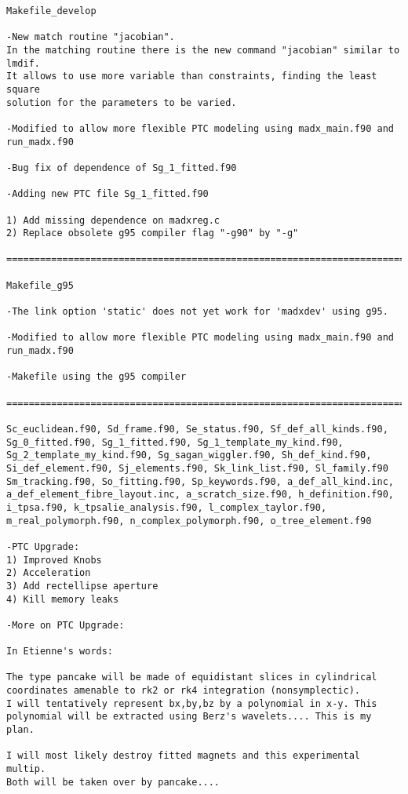 \begin{verbatim}
Makefile_develop

-New match routine "jacobian".
In the matching routine there is the new command "jacobian" similar to lmdif.
It allows to use more variable than constraints, finding the least square
solution for the parameters to be varied.

-Modified to allow more flexible PTC modeling using madx_main.f90 and
run_madx.f90

-Bug fix of dependence of Sg_1_fitted.f90

-Adding new PTC file Sg_1_fitted.f90

1) Add missing dependence on madxreg.c
2) Replace obsolete g95 compiler flag "-g90" by "-g"

=============================================================================

Makefile_g95

-The link option 'static' does not yet work for 'madxdev' using g95.

-Modified to allow more flexible PTC modeling using madx_main.f90 and
run_madx.f90

-Makefile using the g95 compiler

=============================================================================

Sc_euclidean.f90, Sd_frame.f90, Se_status.f90, Sf_def_all_kinds.f90,
Sg_0_fitted.f90, Sg_1_fitted.f90, Sg_1_template_my_kind.f90,
Sg_2_template_my_kind.f90, Sg_sagan_wiggler.f90, Sh_def_kind.f90,
Si_def_element.f90, Sj_elements.f90, Sk_link_list.f90, Sl_family.f90
Sm_tracking.f90, So_fitting.f90, Sp_keywords.f90, a_def_all_kind.inc,
a_def_element_fibre_layout.inc, a_scratch_size.f90, h_definition.f90,
i_tpsa.f90, k_tpsalie_analysis.f90, l_complex_taylor.f90,
m_real_polymorph.f90, n_complex_polymorph.f90, o_tree_element.f90

-PTC Upgrade:
1) Improved Knobs
2) Acceleration
3) Add rectellipse aperture
4) Kill memory leaks

-More on PTC Upgrade:

In Etienne's words:

The type pancake will be made of equidistant slices in cylindrical
coordinates amenable to rk2 or rk4 integration (nonsymplectic).
I will tentatively represent bx,by,bz by a polynomial in x-y. This
polynomial will be extracted using Berz's wavelets.... This is my plan.

I will most likely destroy fitted magnets and this experimental multip.
Both will be taken over by pancake....


\end{verbatim}
